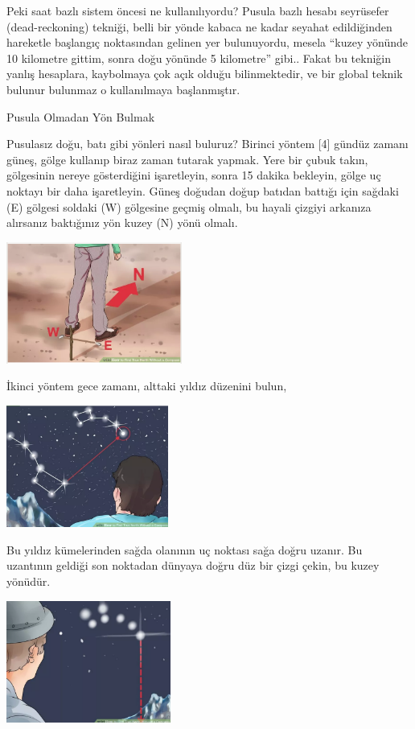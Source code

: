 \documentclass[12pt,fleqn]{article}\usepackage{../../common}
\begin{document}
Peki saat bazlı sistem öncesi ne kullanılıyordu? Pusula bazlı hesabı
seyrüsefer (dead-reckoning) tekniği, belli bir yönde kabaca ne kadar
seyahat edildiğinden hareketle başlangıç noktasından gelinen yer
bulunuyordu, mesela ``kuzey yönünde 10 kilometre gittim, sonra doğu yönünde
5 kilometre'' gibi.. Fakat bu tekniğin yanlış hesaplara, kaybolmaya çok
açık olduğu bilinmektedir, ve bir global teknik bulunur bulunmaz o
kullanılmaya başlanmıştır.

Pusula Olmadan Yön Bulmak

Pusulasız doğu, batı gibi yönleri nasıl buluruz? Birinci yöntem [4] gündüz
zamanı güneş, gölge kullanıp biraz zaman tutarak yapmak. Yere bir çubuk takın,
gölgesinin nereye gösterdiğini işaretleyin, sonra 15 dakika bekleyin, gölge uç
noktayı bir daha işaretleyin. Güneş doğudan doğup batıdan battığı için sağdaki
(E) gölgesi soldaki (W) gölgesine geçmiş olmalı, bu hayali çizgiyi arkanıza
alırsanız baktığınız yön kuzey (N) yönü olmalı.

\includegraphics[height=4cm]{geo_08.png}

İkinci yöntem gece zamanı, alttaki yıldız düzenini bulun, 

\includegraphics[height=4cm]{geo_09.png}

Bu yıldız kümelerinden sağda olanının uç noktası sağa doğru uzanır. Bu uzantının
geldiği son noktadan dünyaya doğru düz bir çizgi çekin, bu kuzey yönüdür. 

\includegraphics[height=4cm]{geo_10.png}
\end{document}
